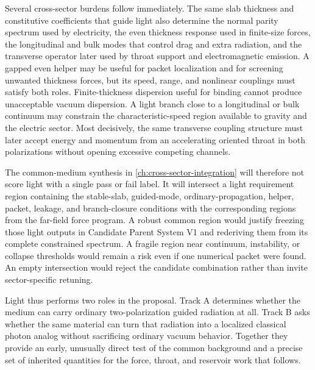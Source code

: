 Several cross-sector burdens follow immediately. The same slab thickness and
constitutive coefficients that guide light also determine the normal parity
spectrum used by electricity, the even thickness response used in finite-size
forces, the longitudinal and bulk modes that control drag and extra radiation,
and the transverse operator later used by throat support and electromagnetic
emission. A gapped even helper may be useful for packet localization and for
screening unwanted thickness forces, but its speed, range, and nonlinear
couplings must satisfy both roles. Finite-thickness dispersion useful for
binding cannot produce unacceptable vacuum dispersion. A light branch close to
a longitudinal or bulk continuum may constrain the characteristic-speed region
available to gravity and the electric sector. Most decisively, the same
transverse coupling structure must later accept energy and momentum from an
accelerating oriented throat in both polarizations without opening excessive
competing channels.

The common-medium synthesis in \cref{ch:cross-sector-integration} will therefore
not score light with a single pass or fail label. It will intersect a light
requirement region containing the stable-slab, guided-mode, ordinary-propagation,
helper, packet, leakage, and branch-closure conditions with the corresponding
regions from the far-field force program. A robust common region would justify
freezing those light outputs in Candidate Parent System V1 and rederiving them
from its complete constrained spectrum. A fragile region near continuum,
instability, or collapse thresholds would remain a risk even if one numerical
packet were found. An empty intersection would reject the candidate combination
rather than invite sector-specific retuning.

Light thus performs two roles in the proposal. Track A determines whether the
medium can carry ordinary two-polarization guided radiation at all. Track B
asks whether the same material can turn that radiation into a localized
classical photon analog without sacrificing ordinary vacuum behavior. Together
they provide an early, unusually direct test of the common background and a
precise set of inherited quantities for the force, throat, and reservoir work
that follows.

